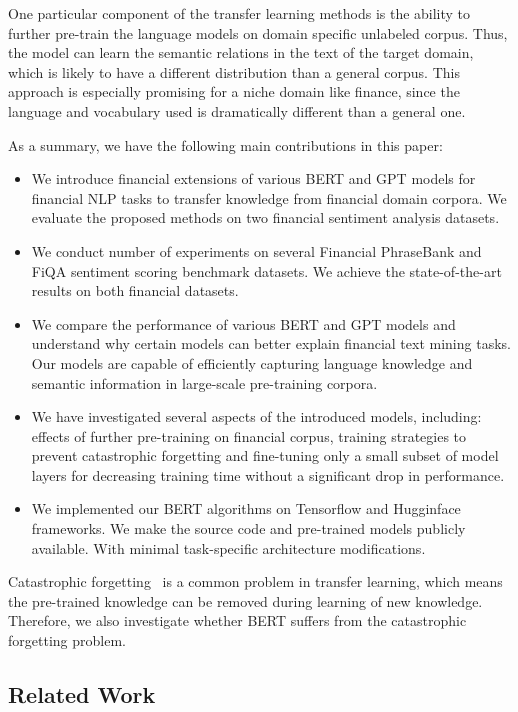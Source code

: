 \documentclass[11pt]{article}
\begin{document}
One particular component of the transfer learning methods is the
ability to further pre-train the language models on domain specific
unlabeled corpus. Thus, the model can learn the semantic relations
in the text of the target domain, which is likely to have a different
distribution than a general corpus. This approach is especially
promising for a niche domain like finance, since the language and
vocabulary used is dramatically different than a general one.

As a summary, we have the following main contributions in this paper:

\begin{itemize}
\item We introduce financial extensions of various BERT and GPT models
  for financial NLP tasks to transfer knowledge from financial domain
  corpora. We evaluate the proposed methods on two
   financial sentiment analysis datasets.
\item We conduct number of experiments on several Financial PhraseBank and FiQA sentiment scoring
  benchmark datasets. We achieve the state-of-the-art results on both financial datasets.
\item We compare the performance of various BERT and GPT models and
  understand why certain models can better explain financial text
  mining tasks. Our models are capable of efficiently capturing language knowledge and semantic
information in large-scale pre-training corpora.
\item We have investigated several aspects of the introduced models, including: effects of further pre-training on financial
corpus, training strategies to prevent catastrophic forgetting and fine-tuning only a small subset of model layers
for decreasing training time without a significant drop in performance.
  \item We implemented our BERT algorithms on Tensorflow and Hugginface
  frameworks. We make the source code and pre-trained models publicly
  available. With minimal task-specific architecture modifications.
\end{itemize}

Catastrophic forgetting~\cite{mccloskey1989} is a common problem in
transfer learning, which means the pre-trained knowledge can be removed during learning of new knowledge.
Therefore, we also investigate whether BERT suffers from the catastrophic forgetting problem.



\subsection{Related Work}
\end{document}
